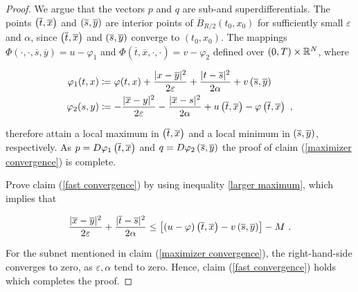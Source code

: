 \begin{lemma}
\begin{proof}
	 		We argue that the vectors $ p $ and $ q $ are sub-and superdifferentials. The points $ \left(\overline{t}, \overline{x}\right) $ and $ \left(\overline{s}, \overline{y}\right) $ are interior points of $ \overline{B}_{R / 2}(t_0, x_0) $ for sufficiently small $ \varepsilon $ and $ \alpha $, since $ \left(\overline{t}, \overline{x}\right) $ and $ \left(\overline{s}, \overline{y}\right) $ converge to $ (t_0, x_0) $. The mappings $ \Phi(\cdot, \cdot, \overline{s}, \overline{y}) = u - \varphi_1 $ and $ \Phi(\overline{t}, \overline{x}, \cdot, \cdot) =  v - \varphi_2 $ defined over $ \left(0, T\right) \times \mathbb{R}^N $, where
	 		
	 		\begin{align*}
	 			\varphi_1(t, x)  &\coloneqq \varphi(t, x) + \frac{\lvert x - \overline{y} \rvert^2}{2 \varepsilon} + \frac{\lvert t - \overline{s} \rvert^2}{2 \alpha} + v\left(\overline{s}, \overline{y}\right) \\
	 			\varphi_2(s, y) &\coloneqq - \frac{\lvert \overline{x} - y \rvert^2}{2 \varepsilon} - \frac{\lvert \overline{x} - s \rvert^2}{2 \alpha} + u\left(\overline{t}, \overline{x}\right) - \varphi\left(\overline{t}, \overline{x}\right) \ ,
	 		\end{align*}
	 		
	 		therefore attain a local maximum in $ \left(\overline{t}, \overline{x}\right) $ and a local minimum in $ \left(\overline{s}, \overline{y}\right) $, respectively. As $ p = D\varphi_1\left(\overline{t}, \overline{x}\right) $ and $ q = D\varphi_2\left(\overline{s}, \overline{y}\right) $ the proof of claim (\ref{maximizer convergence}) is complete.
	 		
	 		Prove claim (\ref{fast convergence}) by using inequality \eqref{larger maximum}, which implies that
	 		
	 		\begin{equation*}
	 			 \frac{\lvert \overline{x} - \overline{y} \rvert^2}{2 \varepsilon} + \frac{\lvert \overline{t} - \overline{s} \rvert^2}{2 \alpha} \leq \left[(u - \varphi)\left(\overline{t}, \overline{x}\right) - v\left(\overline{s}, \overline{y}\right) \right] - M \ .
	 		\end{equation*}
	 		
	 		For the subnet mentioned in claim (\ref{maximizer convergence}), the right-hand-side converges to zero, as $ \varepsilon, \alpha $ tend to zero. Hence, claim (\ref{fast convergence}) holds which completes the proof.
	\end{proof}
\end{lemma}